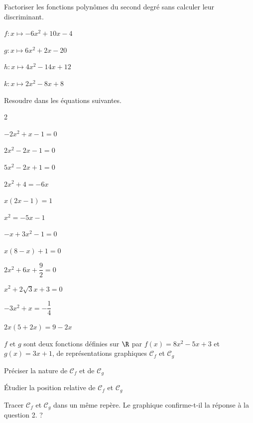 \documentclass[11pt,a4paper]{article}  %
\begin{document}
	\graphicspath{{images/}}
	
	\begin{center}
		
		
	\end{center}

Factoriser les fonctions polynômes du second degré sans calculer leur discriminant.
\begin{enumMet}
	\item $f: x \mapsto-6 x^2+10 x-4$
	\item $g: x \mapsto 6 x^2+2 x-20$
	\item $h: x \mapsto 4 x^2-14 x+12$
	\item $k: x \mapsto 2 x^2-8 x+8$
\end{enumMet}

Resoudre dans \R les équations suivantes.
\begin{multicols}{2}
\begin{enumMet}
	\item $-2 x^2+x-1=0$
	\item $2 x^2-2 x-1=0$
	\item $5 x^2-2 x+1=0$
	\item $2 x^2+4=-6 x$
	\item $x(2 x-1)=1$
	\item $x^2=-5 x-1$
	\item $-x+3 x^2-1=0$
	\item $x(8-x)+1=0$
	\item $2 x^2+6 x+\dfrac{9}{2}=0$
	\item $x^2+2 \sqrt{3} x+3=0$
	\item $-3 x^2+x=-\dfrac{1}{4}$
	\item $2 x(5+2 x)=9-2 x$
\end{enumMet}
\end{multicols}


$f$ et $g$ sont deux fonctions définies sur $\R$ par $f(x)=8 x^2-5 x+3$ et $g(x)=3 x+1$, de représentations graphiques $\mathscr{C}_f$ et $\mathscr{C}_g$
\begin{enumMet}
	\item Préciser la nature de $\mathscr{C}_f$ et de $\mathscr{C}_g$
	\item Étudier la position relative de $\mathscr{C}_f$ et $\mathscr{C}_g$
	\item Tracer $\mathscr{C}_f$ et $\mathscr{C}_g$ dans un même repère. Le graphique confirme-t-il la réponse à la question 2. ?
\end{enumMet}
\end{document}
